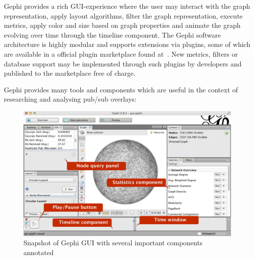 Gephi provides a rich GUI-experience where the user may interact with
the graph representation, apply layout algorithms, filter the graph
representation, execute metrics, apply color and size based on graph
properties and animate the graph evolving over time through the timeline
component. The Gephi software architecture is highly modular and
supports extensions via plugins, some of which are available in a
official plugin marketplace found at~\cite{gephimarketplace}. New
metrics, filters or database support may be implemented through such
plugins by developers and published to the marketplace free of charge.

Gephi provides many tools and components which are useful in the context
of researching and analysing pub/sub overlays:

\begin{figure}[h]
    \centering
    \includegraphics[width=\textwidth]{figures/gui_ann}
    \caption{Snapshot of Gephi GUI with several important components
        annotated}
\end{figure}

